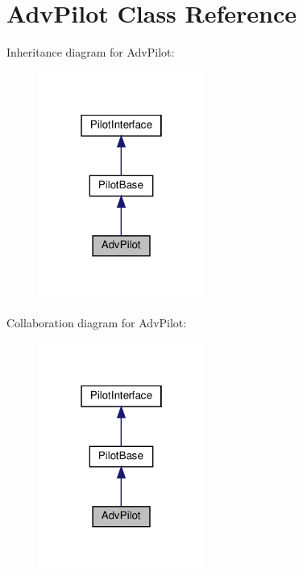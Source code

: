 \hypertarget{classAdvPilot}{}\section{Adv\+Pilot Class Reference}
\label{classAdvPilot}


Inheritance diagram for Adv\+Pilot\+:\nopagebreak
\begin{figure}[H]
\begin{center}
\leavevmode
\includegraphics[width=154pt]{classAdvPilot__inherit__graph}
\end{center}
\end{figure}


Collaboration diagram for Adv\+Pilot\+:\nopagebreak
\begin{figure}[H]
\begin{center}
\leavevmode
\includegraphics[width=154pt]{classAdvPilot__coll__graph}
\end{center}
\end{figure}
